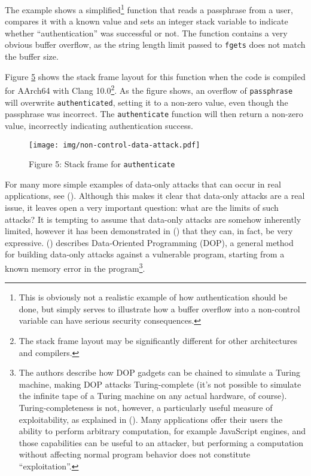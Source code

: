 \documentclass[
  a4paper,
]{report}
\begin{document}
The example shows a simplified\footnote{This is obviously not a
  realistic example of how authentication should be done, but simply
  serves to illustrate how a buffer overflow into a non-control variable
  can have serious security consequences.} function that reads a
passphrase from a user, compares it with a known value and sets an
integer stack variable to indicate whether ``authentication'' was
successful or not. The function contains a very obvious buffer overflow,
as the string length limit passed to \texttt{fgets} does not match the
buffer size.

Figure \hyperref[fig:non-control-data-attack]{5} shows the stack frame
layout for this function when the code is compiled for AArch64 with
Clang 10.0\footnote{The stack frame layout may be significantly
  different for other architectures and compilers.}. As the figure
shows, an overflow of \texttt{passphrase} will overwrite
\texttt{authenticated}, setting it to a non-zero value, even though the
passphrase was incorrect. The \texttt{authenticate} function will then
return a non-zero value, incorrectly indicating authentication success.

\begin{figure}
\centering
\texttt{[image: img/non-control-data-attack.pdf]}
\caption{Figure 5: Stack frame for
\texttt{authenticate}}\label{fig:non-control-data-attack}
\end{figure}

For many more simple examples of data-only attacks that can occur in
real applications, see ().
Although this makes it clear that data-only attacks are a real issue, it
leaves open a very important question: what are the limits of such
attacks? It is tempting to assume that data-only attacks are somehow
inherently limited, however it has been demonstrated in
() that they can, in fact, be very
expressive. () describes
Data-Oriented Programming (DOP), a general method for building data-only
attacks against a vulnerable program, starting from a known memory error
in the program\footnote{The authors describe how DOP gadgets can be
  chained to simulate a Turing machine, making DOP attacks
  Turing-complete (it's not possible to simulate the infinite tape of a
  Turing machine on any actual hardware, of course). Turing-completeness
  is not, however, a particularly useful measure of exploitability, as
  explained in (). Many
  applications offer their users the ability to perform arbitrary
  computation, for example JavaScript engines, and those capabilities
  can be useful to an attacker, but performing a computation without
  affecting normal program behavior does not constitute
  ``exploitation''.}.
\end{document}
